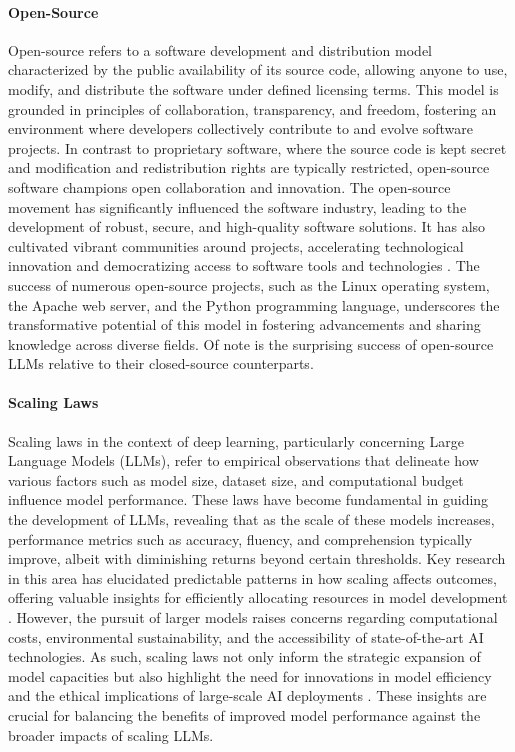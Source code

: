 \documentclass{article}
\begin{document}
\paragraph{Open-Source}
Open-source refers to a software development and distribution model characterized by the public availability of its source code, allowing anyone to use, modify, and distribute the software under defined licensing terms. This model is grounded in principles of collaboration, transparency, and freedom, fostering an environment where developers collectively contribute to and evolve software projects. In contrast to proprietary software, where the source code is kept secret and modification and redistribution rights are typically restricted, open-source software champions open collaboration and innovation. The open-source movement has significantly influenced the software industry, leading to the development of robust, secure, and high-quality software solutions. It has also cultivated vibrant communities around projects, accelerating technological innovation and democratizing access to software tools and technologies \cite{Raymond1999, Weber2004}. The success of numerous open-source projects, such as the Linux operating system, the Apache web server, and the Python programming language, underscores the transformative potential of this model in fostering advancements and sharing knowledge across diverse fields. Of note is the surprising success of open-source LLMs relative to their closed-source counterparts\cite{huggingfaceLMSysChatbot, semianalysisGoogleHave}.

\paragraph{Scaling Laws}
Scaling laws in the context of deep learning, particularly concerning Large Language Models (LLMs), refer to empirical observations that delineate how various factors such as model size, dataset size, and computational budget influence model performance. These laws have become fundamental in guiding the development of LLMs, revealing that as the scale of these models increases, performance metrics such as accuracy, fluency, and comprehension typically improve, albeit with diminishing returns beyond certain thresholds. Key research in this area has elucidated predictable patterns in how scaling affects outcomes, offering valuable insights for efficiently allocating resources in model development \cite{KaplanEtAl2020}. However, the pursuit of larger models raises concerns regarding computational costs, environmental sustainability, and the accessibility of state-of-the-art AI technologies. As such, scaling laws not only inform the strategic expansion of model capacities but also highlight the need for innovations in model efficiency and the ethical implications of large-scale AI deployments \cite{ThompsonEtAl2020}. These insights are crucial for balancing the benefits of improved model performance against the broader impacts of scaling LLMs.
\end{document}
